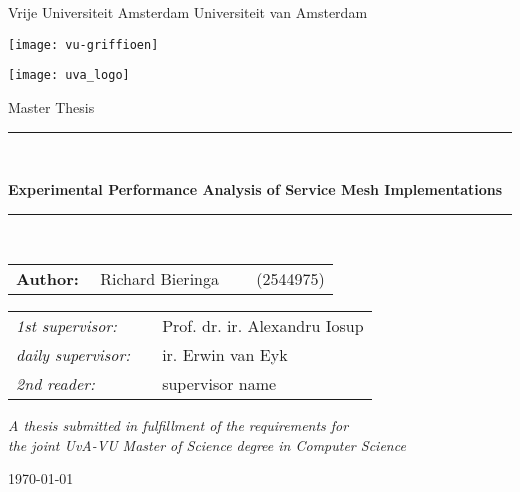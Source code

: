 \thispagestyle{empty}

\begin{center}
Vrije Universiteit Amsterdam \hspace*{2cm} Universiteit van Amsterdam

\vspace{1mm}

\hspace*{-7.5cm}\texttt{[image: vu-griffioen]}

\vspace*{-2cm}\hspace*{7.5cm}\texttt{[image: uva\_logo]}

\vspace{2cm}

{\Large Master Thesis}

\vspace*{1.5cm}

\rule{.9\linewidth}{.6pt}\\[0.4cm]
{\huge \bfseries 
    Experimental Performance Analysis of Service Mesh Implementations
\par}\vspace{0.4cm}
\rule{.9\linewidth}{.6pt}\\[1.5cm]

\vspace*{2mm}

{\Large
\begin{tabular}{l}
{\bf Author:} ~~Richard Bieringa~~~~ (2544975)
\end{tabular}
}

\vspace*{2cm}

\begin{tabular}{ll}
{\it 1st supervisor:}   & ~~Prof. dr. ir. Alexandru Iosup \\
{\it daily supervisor:} & ~~ir. Erwin van Eyk \\
{\it 2nd reader:}       & ~~supervisor name
\end{tabular}

\vspace*{2.5cm}

\textit{A thesis submitted in fulfillment of the requirements for\\ the joint UvA-VU Master of Science degree in Computer Science}

\vspace*{1.8cm}

\today\\[4cm] %

\end{center}